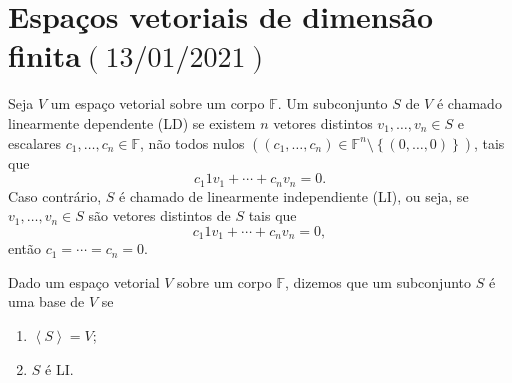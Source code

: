 \chapter{Espaços vetoriais de dimensão finita\quad$\left(13/01/2021\right)$}

\begin{definition}
	Seja $V$ um espaço vetorial sobre um corpo $\mathbb{F}$.
	Um subconjunto $S$ de $V$ é chamado linearmente dependente (LD)
	se existem $n$ vetores distintos $v_{1},\dotsc,v_{n}\in S$ e
	escalares $c_{1},\dotsc,c_{n}\in\mathbb{F}$, não todos nulos
	$\left(\left(c_{1},\dotsc,c_{n}\right)\in\mathbb{F}^{n}\setminus\left\{\left(0,\dotsc,0\right)\right\}\right)$,
	tais que
	\[
		c_{1}1v_{1}+\cdots+c_{n}v_{n}=
		0.
	\]
	Caso contrário, $S$ é chamado de linearmente independiente (LI),
	ou seja, se $v_{1},\dotsc,v_{n}\in S$ são vetores distintos de $S$
	tais que
	\[
		c_{1}1v_{1}+\cdots+c_{n}v_{n}=
		0,
	\]
	então $c_{1}=\cdots=c_{n}=0$.
\end{definition}

\begin{definition}
	Dado um espaço vetorial $V$ sobre um corpo $\mathbb{F}$, dizemos
	que um subconjunto $S$ é uma base de $V$ se
	\begin{enumerate}
		\item

		      \begin{math}
			      \left\langle S\right\rangle=
			      V
		      \end{math};

		\item

		      $S$ é LI.
	\end{enumerate}
\end{definition}

